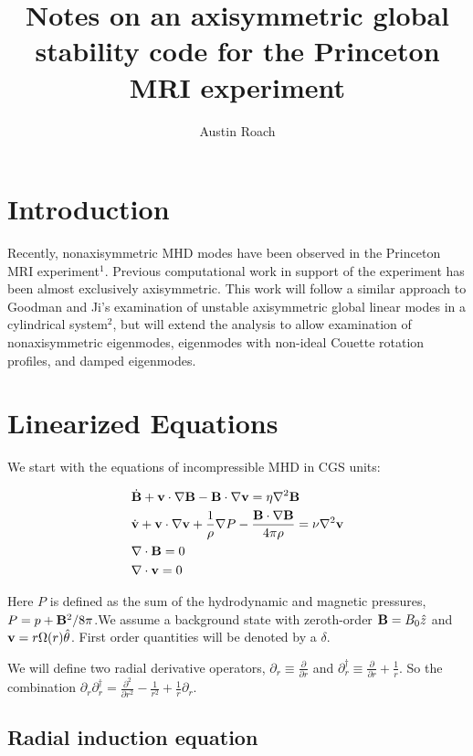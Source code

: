 \documentclass[letterpaper]{article}
\title{Notes on an axisymmetric global stability code for the Princeton MRI experiment}
\author{Austin Roach}
\begin{document}
\maketitle{}

\section{Introduction}

Recently, nonaxisymmetric MHD modes have been observed in the
Princeton MRI experiment$^1$.  Previous computational work in support
of the experiment has been almost exclusively axisymmetric.  This work
will follow a similar approach to Goodman and Ji's examination of
unstable axisymmetric global linear modes in a cylindrical system$^2$,
but will extend the analysis to allow examination of nonaxisymmetric
eigenmodes, eigenmodes with non-ideal Couette rotation profiles, and
damped eigenmodes.

\section{Linearized Equations}

We start with the equations of incompressible MHD in CGS units:

\begin{align}
&\dot{{\bf B}} + {\bf v}\cdot\nabla{\bf B} - {\bf B}\cdot\nabla{\bf v}=\eta\nabla^2 {\bf B}
\\
&\dot{{\bf v}}+{\bf v}\cdot\nabla{\bf v}+\frac{1}{\rho}\nabla{P}-\frac{{\bf B}\cdot\nabla{\bf B}}{4\pi\rho}=\nu\nabla^2{\bf v}
\\
&\nabla\cdot{\bf B}=0
\\
&\nabla\cdot{\bf v}=0
\end{align}

Here $P$ is defined as the sum of the hydrodynamic and magnetic
pressures, $P=p+{\bf B}^2/8\pi$.We assume a background state with
zeroth-order ${\bf B}=B_0 \hat{z}$ and ${\bf
  v}=r\Omega(r)\hat{\theta}$.  First order quantities will be denoted
by a $\delta$.

We will define two radial derivative operators, $\partial_r \equiv
\frac{\partial}{\partial r}$ and $\partial_{r}^\dagger \equiv
\frac{\partial}{\partial r}+\frac{1}{r}$.  So the combination
$\partial_r \partial_r^\dagger = \frac{\partial^2}{\partial
  r^2}-\frac{1}{r^2}+\frac{1}{r}\partial_r$.

\subsection{Radial induction equation}
\end{document}
